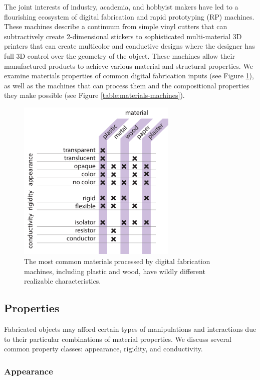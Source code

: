 The joint interests of industry, academia, and hobbyist makers have led to a flourishing ecosystem of digital fabrication and rapid prototyping (RP) machines. These machines describe a continuum from simple vinyl cutters that can subtractively create 2-dimensional stickers to sophisticated multi-material 3D printers that can create multicolor and conductive designs where the designer has full 3D control over the geometry of the object. These machines allow their manufactured products to achieve various material and structural properties. We examine materials properties of common digital fabrication inputs (see Figure \ref{table:fab-properties}), as well as the machines that can process them and the compositional properties they make possible (see Figure \ref{table:materials-machines}).

\begin{figure}
\centering
\includegraphics[width=3in]{figures/fab-properties.pdf}
\caption{The most common materials processed by digital fabrication machines, including plastic and wood, have wildly different realizable characteristics.}
\label{table:fab-properties}
\end{figure}

\subsection{Properties}

Fabricated objects may afford certain types of manipulations and interactions due to their particular combinations of material properties. We discuss several common property classes: appearance, rigidity, and conductivity.

\subsubsection{Appearance}

